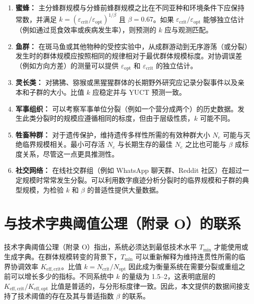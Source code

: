 \documentclass[12pt]{article}
\theoremstyle{remark}
\newcommand{\Tmin}{T_{\min}}
\begin{document}
	\begin{enumerate}
		\item \textbf{蜜蜂：} 主分蜂群规模与分蜂前蜂群规模之比在不同亚种和环境条件下应保持常数，并满足 $k = (\varepsilon_{\text{crit}}/\varepsilon_{\text{opt}})^{1/\beta}$ 且 $\beta = 0.67$。如果 $\varepsilon_{\text{crit}}/\varepsilon_{\text{opt}}$ 能够独立估计（例如通过觅食效率或疾病发生率），则预测的 $k$ 应与观测匹配。
		
		\item \textbf{鱼群：} 在斑马鱼或其他物种的受控实验中，从成群游动到无序游荡（或分裂）发生时的群体规模应按照相同的规律相对于最优群体规模标度。对协调误差（例如方向方差）的测量可以提供 $\varepsilon_{\text{opt}}$ 和 $\varepsilon_{\text{crit}}$ 的独立估计。
		
		\item \textbf{灵长类：} 对狒狒、猕猴或黑猩猩群体的长期野外研究应记录分裂事件以及亲本和子群的大小。比值 $k$ 应稳定并与 YUCT 预测一致。
		
		\item \textbf{军事组织：} 可以考察军事单位分裂（例如一个营分成两个）的历史数据。发生此类分裂时的规模应遵循相同的标度，但由于层级性质，$k$ 可能不同。
		
		\item \textbf{牲畜种群：} 对于遗传保护，维持遗传多样性所需的有效种群大小 $N_e$ 可能与灭绝临界规模相关。最小可存活 $N_e$ 与长期生存的最佳 $N_e$ 之比也可能与 $\beta$ 成标度关系，尽管这一点更具推测性。
		
		\item \textbf{社交网络：} 在线社交群组（例如 WhatsApp 聊天群、Reddit 社区）在超过一定规模时常常发生分裂。可以利用数字痕迹分析分裂时的临界规模和子群的典型规模，为检验 $k$ 和 $\beta$ 的普适性提供大量数据。
	\end{enumerate}
	
	\section{与技术字典阈值公理（附录 O）的联系}
	\label{sec:connection}
	
	技术字典阈值公理（附录 O）指出，系统必须达到最低技术水平 $\Tmin$ 才能使用或生成字典。在群体规模转变的背景下，$\Tmin$ 可以重新解释为维持连贯性所需的临界协调效率 $K_{\mathrm{eff},\text{crit}}$。比值 $k = N_{\text{crit}}/N_{\text{opt}}$ 因此成为衡量系统在需要分裂或重组之前可以增长多少的指标。不同系统中 $k$ 的量级为 1.5–2，这表明底层的 $K_{\mathrm{eff},\text{crit}}/K_{\mathrm{eff},\text{opt}}$ 比值是普适的，与分形标度律一致。因此，本文提供的数据间接支持了技术阈值的存在及其与普适指数 $\beta$ 的联系。
	
\end{document}
